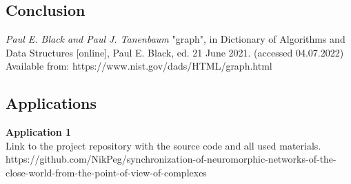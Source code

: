 \documentclass[draft]{article}
\newcommand\zz[1]{\par{\normalsize\strut #1} \hfill\ignorespaces}
\begin{document}
\newpage
\begin{center}
\section {Conclusion}
\end{center}

\newpage
\begin{center}
\begin{thebibliography}{}
 \textit{Paul E. Black and Paul J. Tanenbaum} "graph", in Dictionary of Algorithms and Data Structures [online], Paul E. Black, ed. 21 June 2021. (accessed 04.07.2022) Available from: https://www.nist.gov/dads/HTML/graph.html
\end{thebibliography}
\end{center}
\newpage
\begin{center}
\section {Applications}
\end{center}
\zz{}\textbf{Application 1\\}
Link to the project repository with the source code and all used materials.\\
https://github.com/NikPeg/synchronization-of-neuromorphic-networks-of-the-close-world-from-the-point-of-view-of-complexes\\
\end{document}
